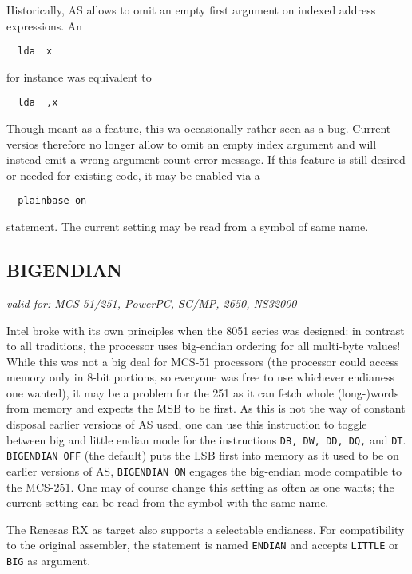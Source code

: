 \documentclass[12pt,twoside]{report}
\makeatletter
\newcommand{\tty}[1]{{\tt #1}}
\newcommand{\ttindex}[1]{\index{#1@{\tt #1}}}
\newcommand{\asname}{{AS}}
\makeatother
\begin{document}
Historically, \asname{} allows to omit an empty first argument on indexed
address expressions.  An
\begin{verbatim}
  lda  x
\end{verbatim}
for instance was equivalent to
\begin{verbatim}
  lda  ,x
\end{verbatim}
Though meant as a feature, this wa occasionally rather seen as a bug.  Current
versios therefore no longer allow to omit an empty index argument and will
instead emit a wrong argument count error message.  If this feature is still
desired or needed for existing code, it may be enabled via a
\begin{verbatim}
  plainbase on
\end{verbatim}
statement.  The current setting may be read from a symbol of same name.


\subsection{BIGENDIAN}
\ttindex{ENDIAN}\ttindex{BIGENDIAN}\label{SectBIGENDIAN}

{\em valid for: MCS-51/251, PowerPC, SC/MP, 2650, NS32000}

Intel broke with its own principles when the 8051 series was designed: in
contrast to all traditions, the processor uses big-endian ordering for all
multi-byte values!  While this was not a big deal for MCS-51 processors
(the processor could access memory only in 8-bit portions, so everyone was
free to use whichever endianess one wanted), it may be a problem for the
251 as it can fetch whole (long-)words from memory and expects the MSB to
be first.  As this is not the way of constant disposal earlier versions of
\asname{} used, one can use this instruction to toggle between big and
little endian mode for the instructions \tty{DB, DW, DD, DQ,} and
\tty{DT}.  \tty{BIGENDIAN OFF} (the default) puts the LSB first into
memory as it used to be on earlier versions of \asname{}, \tty{BIGENDIAN ON}
engages the big-endian mode compatible to the MCS-251.  One may of course
change this setting as often as one wants; the current setting can be read
from the symbol with the same name.

The Renesas RX as target also supports a selectable endianess.  For
compatibility to the original assembler, the statement is named \tty{ENDIAN}
and accepts \tty{LITTLE} or \tty{BIG} as argument.
\end{document}
